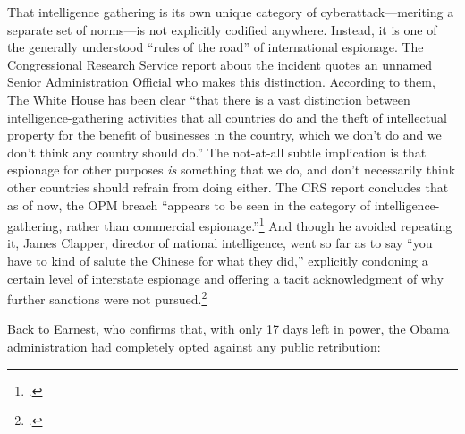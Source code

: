 \documentclass{memoir}
\begin{document}
\begin{refsegment}
That intelligence gathering is its own unique category of cyberattack---meriting a separate set of norms---is not explicitly codified anywhere. Instead, it is one of the generally understood ``rules of the road'' of international espionage. The Congressional Research Service report about the incident quotes an unnamed Senior Administration Official who makes this distinction. According to them, The White House has been clear ``that there is a vast distinction between intelligence-gathering activities that all countries do and the theft of intellectual property for the benefit of businesses in the country, which we don't do and we don't think any country should do.'' The not-at-all subtle implication is that espionage for other purposes \emph{is} something that we do, and don't necessarily think other countries should refrain from doing either. The CRS report concludes that as of now, the OPM breach ``appears to be seen in the category of intelligence-gathering, rather than commercial espionage.''\footcite{finklea_cyber_2015} And though he avoided repeating it, James Clapper, director of national intelligence, went so far as to say ``you have to kind of salute the Chinese for what they did,'' explicitly condoning a certain level of interstate espionage and offering a tacit acknowledgment of why further sanctions were not pursued.\footcite{sanger_u.s._2015}

Back to Earnest, who confirms that, with only 17 days left in power, the Obama administration had completely opted against any public retribution:


\end{refsegment}
\end{document}
